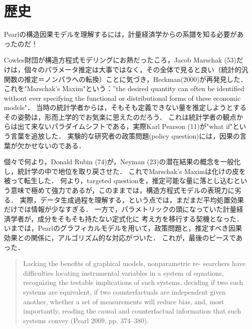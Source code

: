 \documentclass[uplatex,dvipdfmx]{jsreport}
\begin{document}
\section{歴史}

\begin{tcolorbox}[colframe=ForestGreen, colback=ForestGreen!10!white,breakable,colbacktitle=ForestGreen!40!white,coltitle=black,fonttitle=\bfseries\sffamily,
title=]
    Pearlの構造因果モデルを理解するには，計量経済学からの系譜を知る必要があったのだ！
\end{tcolorbox}

\begin{history}
    Cowles財団が構造方程式モデリングにお熱だったころ，Jacob Marschak (53)だけは，個々のパラメータ推定は大事ではなく，その全体で見ると良い（統計的汎関数の推定＝ノンパラへの転換）ことに気づき，Heckman(2000)が再発見した．
    これを"Marschak's Maxim"という：”the desired quantity can often be identified without ever specifying
    the functional or distributional forms of these economic models"．
    当時の統計学者からは，そもそも定義できない量を推定しようとするその姿勢は，形而上学的でお気楽に思えたのだろう．
    これは統計学者の観点からは出て来ないパラダイムシフトである，実際Karl Pearson (11)が"what if"という言葉を追放した．
    実験的な研究者の政策問題(policy question)には，因果の言葉が欠かせないのである．

    個々で何より，Donald Rubin (74)が，Neyman (23)の潜在結果の概念を一般化し，統計学の中で地位を取り戻させた．
    これでMarschak's Maximは化けの皮を被って転生した．
    何より，targeted questionを，推定可能な量に落とし込むという意味で極めて強力であるが，このままでは，構造方程式モデルの表現力に劣る．
    実際，データ生成過程を理解する，という点では，まだまだ平均処置効果だけでは情報が少なすぎる．
    一方で，パラメトリックの頭になっていた計量経済学者が，成分をそもそも持たない定式化に
    考え方を移行する契機となった．
    いまでは，Pearlのグラフィカルモデルを用いて，政策問題と，推定すべき因果効果との関係に，アルゴリズム的な対応がついた．
    これが，最後のピースであった．
    \begin{quote}
        Lacking the benefits of graphical models, nonparametric re-
    searchers have difficulties locating instrumental variables in a system of equations,
    recognizing the testable implications of such systems, deciding if two such systems
    are equivalent, if two counterfactuals are independent given another, whether a set
    of measurements will reduce bias, and, most importantly, reading the causal and
    counterfactual information that such systems convey (Pearl 2009, pp. 374–380).
    \end{quote}
\end{history}
\end{document}
